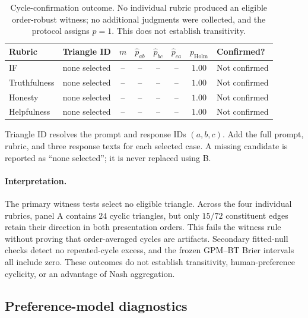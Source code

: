\documentclass{article}
\theoremstyle{remark}
\theoremstyle{plain}
\begin{document}
\begin{table}[htbp]
\centering\footnotesize
\setlength{\tabcolsep}{4pt}
\caption{Cycle-confirmation outcome. No individual rubric produced an eligible order-robust witness; no additional judgments were collected, and the protocol assigns $p=1$. This does not establish transitivity.}
\label{tab:within-rubric-example}
\begin{tabular*}{\linewidth}{@{\extracolsep{\fill}}lccccccl}
\toprule
Rubric & Triangle ID & $m$ & $\widehat p_{ab}$ & $\widehat p_{bc}$ & $\widehat p_{ca}$ & $p_{\mathrm{Holm}}$ & Confirmed?\\
\midrule
IF           & none selected & -- & -- & -- & -- & $1.00$ & Not confirmed\\
Truthfulness & none selected & -- & -- & -- & -- & $1.00$ & Not confirmed\\
Honesty      & none selected & -- & -- & -- & -- & $1.00$ & Not confirmed\\
Helpfulness  & none selected & -- & -- & -- & -- & $1.00$ & Not confirmed\\
\bottomrule
\end{tabular*}

\smallskip
\parbox{0.97\linewidth}{\scriptsize Triangle ID resolves the prompt and response IDs $(a,b,c)$. Add the full prompt, rubric, and three response texts for each selected case. A missing candidate is reported as ``none selected''; it is never replaced using B.}
\end{table}

\paragraph{Interpretation.}
The primary witness tests select no eligible triangle. Across the four individual rubrics, panel A contains $24$ cyclic triangles, but only $15/72$ constituent edges retain their direction in both presentation orders. This fails the witness rule without proving that order-averaged cycles are artifacts. Secondary fitted-null checks detect no repeated-cycle excess, and the frozen GPM--BT Brier intervals all include zero. These outcomes do not establish transitivity, human-preference cyclicity, or an advantage of Nash aggregation.
\FloatBarrier

\subsection{Preference-model diagnostics}
\end{document}
